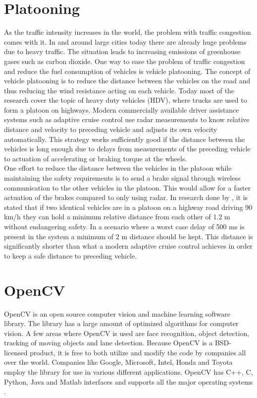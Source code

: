 \section{Platooning}
As the traffic intensity increases in the world, the problem with traffic congestion comes with it. In and around large cities today there are already huge problems due to heavy traffic. The situation leads to increasing emissions of greenhouse gases such as carbon dioxide. One way to ease the problem of traffic congestion and reduce the fuel consumption of vehicles is vehicle platooning. The concept of vehicle platooning is to reduce the distance between the vehicles on the road and thus reducing the wind resistance acting on each vehicle. Today most of the research cover the topic of heavy duty vehicles (HDV), where trucks are used to form a platoon on highways. Modern commercially available driver assistance systems such as adaptive cruise control use radar measurements to know relative distance and velocity to preceding vehicle and adjusts its own velocity automatically. This strategy works sufficiently good if the distance between the vehicles is long enough due to delays from measurements of the preceding vehicle to actuation of accelerating or braking torque at the wheels.\\

One effort to reduce the distance between the vehicles in the platoon while maintaining the safety requirements is to send a brake signal through wireless communication to the other vehicles in the platoon. This would allow for a faster actuation of the brakes compared to only using radar. In research done by \cite{alam2014guaranteeing}, it is stated that if two identical vehicles are in a platoon on a highway road driving 90 km/h they can hold a minimum relative distance from each other of 1.2 m without endangering safety. In a scenario where a worst case delay of 500 ms is present in the system a minimum of 2 m distance should be kept. This distance is significantly shorter than what a modern adaptive cruise control achieves in order to keep a safe distance to preceding vehicle.\\




\section{OpenCV}
OpenCV is an open source computer vision and machine learning software library. The library has a large amount of optimized algorithms for computer vision. A few areas where OpenCV is used are face recognition, object detection, tracking of moving objects and lane detection. Because OpenCV is a BSD-licensed product, it is free to both utilize and modify the code by companies all over the world. Companies like Google, Microsoft, Intel, Honda and Toyota employ the library for use in various different applications. OpenCV has C++, C, Python, Java and Matlab interfaces and supports all the major operating systems \cite{opencv}.\\

